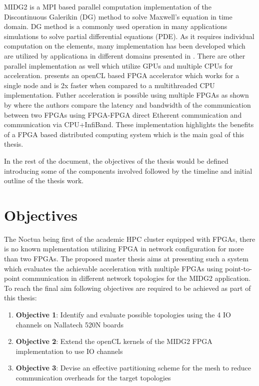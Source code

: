 \documentclass[english,notitlepage]{hgbreport}
\begin{document}
MIDG2 is a MPI based parallel computation implementation of the Discontinuous Galerikin (DG) \cite{hesthaven_nodal_2008} method
to solve Maxwell's equation in time domain. DG method is a commonly used operation in many applications simulations to solve
partial differential equations (PDE). As it requires individual computation on the elements, many implementation
has been developed which are utilized by applicationa in different domains presented in \cite{ye_discontinuous_2011, wilcox_high-order_2010,
collis_discontinuous_2002}. There are other parallel implementation as well which utilize GPUs \cite{afzal_solving_2018, klockner_nodal_2009}
and multiple CPUs \cite{baggag_parallel_1999} for acceleration. \textcite{kenter_opencl-based_2018} presents an openCL based
FPGA accelerator which works for a single node and is 2x faster when compared to a multithreaded CPU implementation. Futher acceleration
is possible using multiple FPGAs as shown by \textcite{kobayashi_opencl-ready_2018} where the authors compare the latency and bandwidth
of the communication between two FPGAs using FPGA-FPGA direct Etherent communication and communication via CPU+InfiBand.
These implementation highlights the benefits of a FPGA based distributed computing system which is the main goal of this thesis.

In the rest of the document, the objectives of the thesis would be defined introducing some of the components involved followed
by the timeline and initial outline of the thesis work.


\section{Objectives}

The Noctua being first of the academic HPC cluster equipped with FPGAs, there is no known mplementation
utilizing FPGA in network configuration for more than two FPGAs. The proposed master thesis aims at presenting
such a system which evaluates the achievable acceleration with multiple FPGAs using point-to-point communication
in different network topologies for the MIDG2 application. To reach the final aim following objectives are
required to be achieved as part of this thesis:

\begin{enumerate}
	\item \textbf{Objective 1}: Identify and evaluate possible topologies using the 4 IO channels on Nallatech 520N boards
	\item \textbf{Objective 2}: Extend the openCL kernels of the MIDG2 FPGA implementation to use IO channels
	\item \textbf{Objective 3}: Devise an effective partitioning scheme for the mesh to reduce communication overheads for the target topologies
\end{enumerate}
\end{document}
